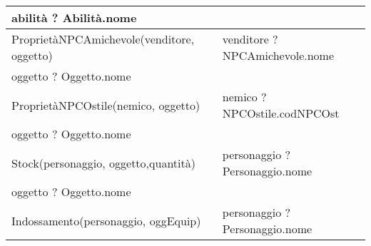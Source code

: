 \begin{table}[H]
{\begin{tabular}{|l|l|}
abilità ? Abilità.nome                                                                                                                                                                                                                     &                                            \\ \hline
ProprietàNPCAmichevole(venditore, oggetto)                                                                                                                                                                                                 & venditore ? NPCAmichevole.nome             \\ \hline
oggetto ? Oggetto.nome                                                                                                                                                                                                                     &                                            \\ \hline
ProprietàNPCOstile(nemico, oggetto)                                                                                                                                                                                                        & nemico ? NPCOstile.codNPCOst               \\ \hline
oggetto ? Oggetto.nome                                                                                                                                                                                                                     &                                            \\ \hline
Stock(personaggio, oggetto,quantità)                                                                                                                                                                                                       & personaggio ? Personaggio.nome             \\ \hline
oggetto ? Oggetto.nome                                                                                                                                                                                                                     &                                            \\ \hline
Indossamento(personaggio, oggEquip)                                                                                                                                                                                                        & personaggio ? Personaggio.nome             \\ \hline

\end{tabular}}
\end{table}
